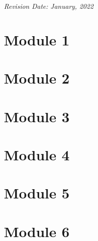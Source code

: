 \documentclass[11pt,fleqn]{book} %
\begin{document}
\noindent \textit{Revision Date: January, 2022} %




\pagestyle{empty} %

\tableofcontents %

\cleardoublepage %

\pagestyle{fancy} %

\part{Module 1}



\part{Module 2}




\part{Module 3}




\part{Module 4}



\part{Module 5}



\part{Module 6}


\end{document}
